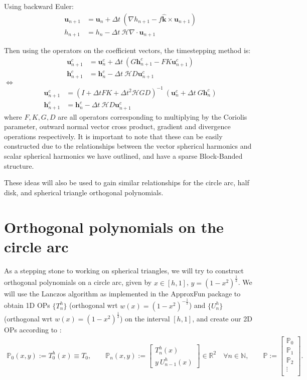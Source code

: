 \documentclass[11pt, oneside]{article}   	%
\newcommand{\R}{\mathbb{R}}
\newcommand{\N}{\mathbb{N}}
\newcommand{\bigP}{\mathbb{P}}
\newcommand{\unitvec}{\hat{\bm{k}}}
\begin{document}
Using backward Euler:
\begin{align}
\mathbf{u}_{n+1} &= \mathbf{u}_{n} + \Delta t \: (\nabla h_{n+1} - f \unitvec \times \mathbf{u}_{n+1}) \\
h_{n+1} &= h_n - \Delta t \: \mathcal{H} \nabla \cdot \mathbf{u}_{n+1}
\end{align}

Then using the operators on the coefficient vectors, the timestepping method is: 
\begin{align}
\mathbf{u}^c_{n+1} &= \mathbf{u}^c_{n} + \Delta t \: (G \mathbf{h}^c_{n+1} - F K \mathbf{u}^c_{n+1}) \\
\mathbf{h}^c_{n+1} &= \mathbf{h}^c_n - \Delta t \: \mathcal{H} D \mathbf{u}^c_{n+1}
\end{align}
$\iff$
\begin{align}
\mathbf{u}^c_{n+1} &= (I + \Delta t F K + \Delta t^2 \mathcal{H} G D)^{-1} \: (\mathbf{u}^c_{n} + \Delta t \: G \mathbf{h}^c_n) \\
\mathbf{h}^c_{n+1} &= \mathbf{h}^c_n - \Delta t \: \mathcal{H} D \mathbf{u}^c_{n+1}
\end{align}
where $F, K, G, D$ are all operators corresponding to multiplying by the Coriolis parameter, outward normal vector cross product, gradient and divergence operations respectively. It is important to note that these can be easily constructed due to the relationships between the vector spherical harmonics and scalar spherical harmonics we have outlined, and have a sparse Block-Banded structure.

These ideas will also be used to gain similar relationships for the circle arc, half disk, and spherical triangle orthogonal polynomials.


\section{Orthogonal polynomials on the circle arc}

As a stepping stone to working on spherical triangles, we will try to construct orthogonal polynomials on a circle arc, given by $x \in [h, 1]$, $y = (1-x^2)^\frac{1}{2}$. We will use the Lanczos algorithm as implemented in the ApproxFun package \cite{ApproxFun} to obtain 1D OPs $\{T^h_n\}$ (orthogonal wrt $w(x) = (1-x^2)^{-\frac{1}{2}}$) and $\{U^h_n\}$ (orthogonal wrt $w(x) = (1-x^2)^{\frac{1}{2}}$) on the interval $[h,1]$, and create our 2D OPs according to \cite{huybrechs2010fourier}:
\begin{align}
\bigP_0(x,y) := T^h_0(x) \equiv T_0,
\quad \quad 
\bigP_n(x,y) := \begin{bmatrix}
		T^h_n(x) \\
		y \: U^h_{n-1}(x)
	\end{bmatrix} \in \R^2 \quad \forall n \in \N,
\quad \quad 
\bigP := \begin{bmatrix}
		\bigP_0 \\
		\hline
		\bigP_1 \\
		\hline
		\bigP_2 \\
		\vdots \\
	\end{bmatrix}.
\end{align}
\end{document}
